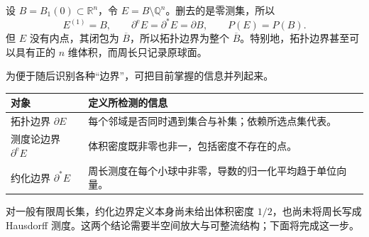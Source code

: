 \begin{example}\label{g3:exm:topological-boundary-null-modification}
	设 \(B=B_1(0)\subset\mathbb R^n\)，令 \(E=B\setminus\mathbb Q^n\)。删去的是零测集，所以
	\[
		E^{(1)}=B,\qquad
		\partial^{\mathrm e}E=\partial^*E=\partial B,\qquad
		P(E)=P(B).
	\]
	但 \(E\) 没有内点，其闭包为 \(\overline B\)，所以拓扑边界为整个 \(\overline B\)。特别地，拓扑边界甚至可以具有正的 \(n\) 维体积，而周长只记录原球面。
\end{example}

为便于随后识别各种“边界”，可把目前掌握的信息并列起来。
\begin{center}
	\begin{tabular}{p{}p{}}
		\toprule
		对象 & 定义所检测的信息\\
		\midrule
		拓扑边界 \(\partial E\) & 每个邻域是否同时遇到集合与补集；依赖所选点集代表。\\
		测度论边界 \(\partial^{\mathrm e}E\) & 体积密度既非零也非一，包括密度不存在的点。\\
		约化边界 \(\partial^*E\) & 周长测度在每个小球中非零，导数的归一化平均趋于单位向量。\\
		\bottomrule
	\end{tabular}
\end{center}

对一般有限周长集，约化边界定义本身尚未给出体积密度 \(1/2\)，也尚未将周长写成 Hausdorff 测度。这两个结论需要半空间放大与可整流结构；下面将完成这一步。
